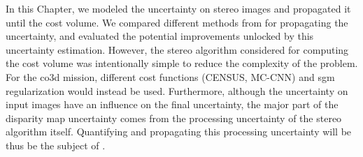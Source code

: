 In this Chapter, we modeled the uncertainty on stereo images and propagated it until the cost volume. We compared different methods from  for propagating the uncertainty, and evaluated the potential improvements unlocked by this uncertainty estimation. However, the stereo algorithm considered for computing the cost volume was intentionally simple to reduce the complexity of the problem. For the \acrshort{co3d} mission, different cost functions (CENSUS, MC-CNN) and \acrshort{sgm} regularization would instead be used. Furthermore, although the uncertainty on input images have an influence on the final uncertainty, the major part of the disparity map uncertainty comes from the processing uncertainty of the stereo algorithm itself. Quantifying and propagating this processing uncertainty will be thus be the subject of .

\pagebreak
\blankpage